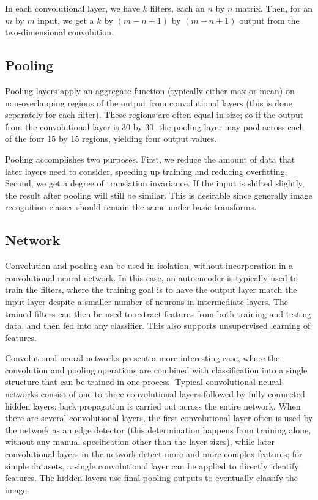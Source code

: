 \documentclass[10pt,twocolumn]{article}
\begin{document}
In each convolutional layer, we have $k$ filters, each an $n$ by $n$ matrix. Then, for an $m$ by $m$ input, we get a $k$ by $(m - n + 1)$ by $(m - n + 1)$ output from the two-dimensional convolution.

\subsection{Pooling}

Pooling layers apply an aggregate function (typically either max or mean) on non-overlapping regions of the output from convolutional layers (this is done separately for each filter). These regions are often equal in size; so if the output from the convolutional layer is 30 by 30, the pooling layer may pool across each of the four 15 by 15 regions, yielding four output values.

Pooling accomplishes two purposes. First, we reduce the amount of data that later layers need to consider, speeding up training and reducing overfitting. Second, we get a degree of translation invariance. If the input is shifted slightly, the result after pooling will still be similar. This is desirable since generally image recognition classes should remain the same under basic transforms.

\subsection{Network}

Convolution and pooling can be used in isolation, without incorporation in a convolutional neural network. In this case, an autoencoder is typically used to train the filters, where the training goal is to have the output layer match the input layer despite a smaller number of neurons in intermediate layers. The trained filters can then be used to extract features from both training and testing data, and then fed into any classifier. This also supports unsupervised learning of features.

Convolutional neural networks present a more interesting case, where the convolution and pooling operations are combined with classification into a single structure that can be trained in one process. Typical convolutional neural networks consist of one to three convolutional layers followed by fully connected hidden layers; back propagation is carried out across the entire network. When there are several convolutional layers, the first convolutional layer often is used by the network as an edge detector (this determination happens from training alone, without any manual specification other than the layer sizes), while later convolutional layers in the network detect more and more complex features; for simple datasets, a single convolutional layer can be applied to directly identify features. The hidden layers use final pooling outputs to eventually classify the image.
\end{document}
